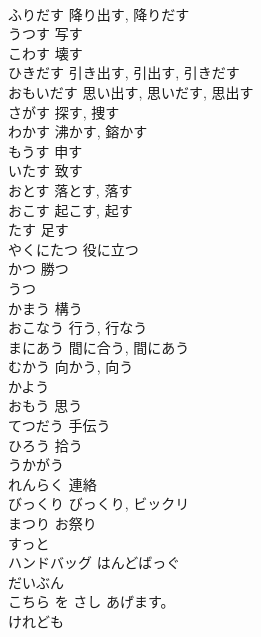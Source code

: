 \documentclass[8pt]{extreport}
\begin{document}
\begin{CJK}{UTF8}{min}
\\	ふりだす	降り出す, 降りだす
\\	うつす	写す
\\	こわす	壊す
\\	ひきだす	引き出す, 引出す, 引きだす
\\	おもいだす	思い出す, 思いだす, 思出す
\\	さがす	探す, 捜す
\\	わかす	沸かす, 鎔かす
\\	もうす	申す
\\	いたす	致す
\\	おとす	落とす, 落す
\\	おこす	起こす, 起す
\\	たす	足す
\\	やくにたつ	役に立つ
\\	かつ	勝つ
\\	うつ	
\\	かまう	構う
\\	おこなう	行う, 行なう
\\	まにあう	間に合う, 間にあう
\\	むかう	向かう, 向う
\\	かよう	
\\	おもう	思う
\\	てつだう	手伝う
\\	ひろう	拾う
\\	うかがう	
\\	れんらく	連絡
\\	びっくり	びっくり, ビックリ
\\	まつり	お祭り
\\	すっと	
\\	ハンドバッグ	はんどばっぐ
\\	だいぶん	
\\	こちら を さし あげます。	
\\	けれども	
\end{CJK}
\end{document}

